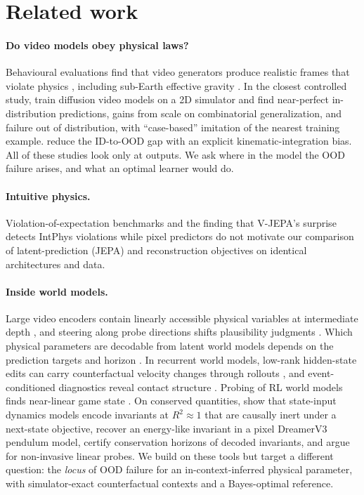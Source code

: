 \section{Related work}
\label{sec:related}

\paragraph{Do video models obey physical laws?} Behavioural evaluations find that video
generators produce realistic frames that violate physics
\citep{motamed2026physicsiq,zhang2025morpheus}, including sub-Earth effective gravity
\citep{thozhiyoor2025slower}. In the closest controlled study, \citet{kang2025far} train
diffusion video models on a 2D simulator and find near-perfect in-distribution predictions,
gains from scale on combinatorial generalization, and failure out of distribution, with
``case-based'' imitation of the nearest training example. \citet{li2026ldr} reduce the
ID-to-OOD gap with an explicit kinematic-integration bias. All of these studies look only at
outputs. We ask where in the model the OOD failure arises, and what an optimal learner would do.

\paragraph{Intuitive physics.} Violation-of-expectation benchmarks
\citep{riochet2018intphys,piloto2022intuitive,bear2021physion} and the finding that V-JEPA's
surprise detects IntPhys violations while pixel predictors do not \citep{bardes2024vjepa,garrido2025intuitive}
motivate our comparison of latent-prediction (JEPA) and reconstruction objectives on identical
architectures and data.

\paragraph{Inside world models.} Large video encoders contain linearly accessible physical
variables at intermediate depth \citep{joseph2026interpreting}, and steering along probe
directions shifts plausibility judgments \citep{alam2026cav}. Which physical parameters are
decodable from latent world models depends on the prediction targets and horizon
\citep{tan2026latent}. In recurrent world models, low-rank hidden-state edits can carry
counterfactual velocity changes through rollouts \citep{liu2026carriers,chen2026compact}, and
event-conditioned diagnostics reveal contact structure \citep{liu2026event}. Probing of RL world
models finds near-linear game state \citep{rlprobe2026}. On conserved quantities,
\citet{liao2026objective} show that state-input dynamics models encode invariants at $R^2\approx1$
that are causally inert under a next-state objective, \citet{bao2026invariant} recover an
energy-like invariant in a pixel DreamerV3 pendulum model, \citet{wang2026certified} certify
conservation horizons of decoded invariants, and \citet{interno2026observer} argue for
non-invasive linear probes. We build on these tools but target a different question: the
\emph{locus} of OOD failure for an in-context-inferred physical parameter, with
simulator-exact counterfactual contexts and a Bayes-optimal reference.

